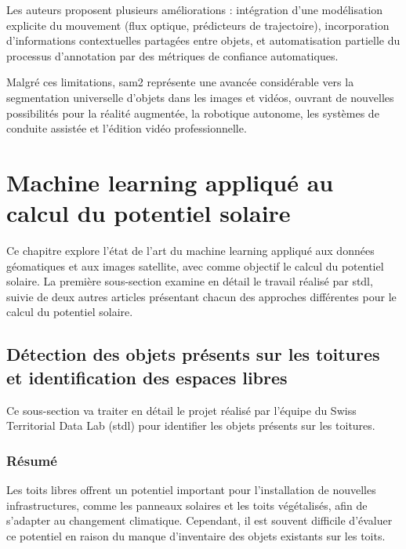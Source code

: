 Les auteurs proposent plusieurs améliorations : intégration d'une modélisation explicite du mouvement (flux optique, prédicteurs de trajectoire), incorporation d'informations contextuelles partagées entre objets, et automatisation partielle du processus d'annotation par des métriques de confiance automatiques.

Malgré ces limitations, \acrshort{sam2} représente une avancée considérable vers la segmentation universelle d'objets dans les images et vidéos, ouvrant de nouvelles possibilités pour la réalité augmentée, la robotique autonome, les systèmes de conduite assistée et l'édition vidéo professionnelle.
\section{Machine learning appliqué au calcul du potentiel solaire}
Ce chapitre explore l'état de l'art du machine learning appliqué aux données géomatiques et aux images satellite, avec comme objectif le calcul du potentiel solaire. La première sous-section examine en détail le travail réalisé par \acrshort{stdl}, suivie de deux autres articles présentant chacun des approches différentes pour le calcul du potentiel solaire.

\subsection{Détection des objets présents sur les toitures et identification des espaces libres}
\label{subsec:stdl_analyse}
\vspace{2mm}
\par{Ce sous-section va traiter en détail le projet \cite{herny_detection_2024} réalisé par l'équipe du Swiss Territorial Data Lab (\acrshort{stdl}) pour identifier les objets présents sur les toitures.}

\subsubsection{Résumé}
\par{Les toits libres offrent un potentiel important pour l'installation de nouvelles infrastructures, comme les panneaux solaires et les toits végétalisés, afin de s'adapter au changement climatique. Cependant, il est souvent difficile d'évaluer ce potentiel en raison du manque d'inventaire des objets existants sur les toits.}

